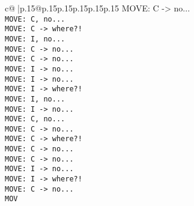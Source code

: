 \documentclass{article}
\begin{document}
{\begin{supertabular}{c@{$\;$}|p{.15\linewidth}@{}p{.15\linewidth}p{.15\linewidth}p{.15\linewidth}p{.15\linewidth}p{.15\linewidth}}
{{{  MOVE: C -> no...\\ \tt  MOVE: C, no...\\ \tt  MOVE: C -> where?!\\ \tt  MOVE: I, no...\\ \tt  MOVE: C -> no...\\ \tt  MOVE: C -> no...\\ \tt  MOVE: I -> no...\\ \tt  MOVE: I -> no...\\ \tt  MOVE: I -> where?!\\ \tt  MOVE: I, no...\\ \tt  MOVE: I -> no...\\ \tt  MOVE: C, no...\\ \tt  MOVE: C -> no...\\ \tt  MOVE: C -> where?!\\ \tt  MOVE: C -> no...\\ \tt  MOVE: C -> no...\\ \tt  MOVE: I -> no...\\ \tt  MOVE: I -> where?!\\ \tt  MOVE: C -> no...\\ \tt  MOV}}}
\end{supertabular}}
\end{document}
